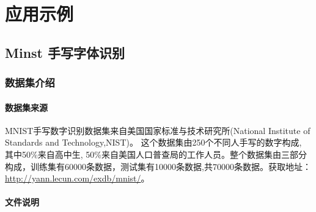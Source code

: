 \documentclass[UTF-8]{progbookcn}
\begin{document}
\part{应用示例}



\chapter{Minst 手写字体识别}
\section{数据集介绍}

\subsection{数据集来源}
MNIST手写数字识别数据集来自美国国家标准与技术研究所(National Institute of Standards and Technology,NIST)。
这个数据集由250个不同人手写的数字构成, 其中50\%来自高中生, 50\%来自美国人口普查局的工作人员。整个数据集由三部分构成，训练集有60000条数据，测试集有10000条数据,共70000条数据。获取地址：\url{ http://yann.lecun.com/exdb/mnist/}。


\subsection{文件说明}
\end{document}
